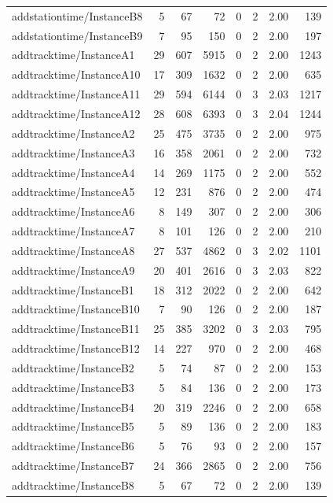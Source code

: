 \begin{tabular}{lrrrrrrr}
addstationtime/InstanceB8 & 5 & 67 & 72 & 0 & 2 & 2.00 & 139 \\
addstationtime/InstanceB9 & 7 & 95 & 150 & 0 & 2 & 2.00 & 197 \\
addtracktime/InstanceA1 & 29 & 607 & 5915 & 0 & 2 & 2.00 & 1243 \\
addtracktime/InstanceA10 & 17 & 309 & 1632 & 0 & 2 & 2.00 & 635 \\
addtracktime/InstanceA11 & 29 & 594 & 6144 & 0 & 3 & 2.03 & 1217 \\
addtracktime/InstanceA12 & 28 & 608 & 6393 & 0 & 3 & 2.04 & 1244 \\
addtracktime/InstanceA2 & 25 & 475 & 3735 & 0 & 2 & 2.00 & 975 \\
addtracktime/InstanceA3 & 16 & 358 & 2061 & 0 & 2 & 2.00 & 732 \\
addtracktime/InstanceA4 & 14 & 269 & 1175 & 0 & 2 & 2.00 & 552 \\
addtracktime/InstanceA5 & 12 & 231 & 876 & 0 & 2 & 2.00 & 474 \\
addtracktime/InstanceA6 & 8 & 149 & 307 & 0 & 2 & 2.00 & 306 \\
addtracktime/InstanceA7 & 8 & 101 & 126 & 0 & 2 & 2.00 & 210 \\
addtracktime/InstanceA8 & 27 & 537 & 4862 & 0 & 3 & 2.02 & 1101 \\
addtracktime/InstanceA9 & 20 & 401 & 2616 & 0 & 3 & 2.03 & 822 \\
addtracktime/InstanceB1 & 18 & 312 & 2022 & 0 & 2 & 2.00 & 642 \\
addtracktime/InstanceB10 & 7 & 90 & 126 & 0 & 2 & 2.00 & 187 \\
addtracktime/InstanceB11 & 25 & 385 & 3202 & 0 & 3 & 2.03 & 795 \\
addtracktime/InstanceB12 & 14 & 227 & 970 & 0 & 2 & 2.00 & 468 \\
addtracktime/InstanceB2 & 5 & 74 & 87 & 0 & 2 & 2.00 & 153 \\
addtracktime/InstanceB3 & 5 & 84 & 136 & 0 & 2 & 2.00 & 173 \\
addtracktime/InstanceB4 & 20 & 319 & 2246 & 0 & 2 & 2.00 & 658 \\
addtracktime/InstanceB5 & 5 & 89 & 136 & 0 & 2 & 2.00 & 183 \\
addtracktime/InstanceB6 & 5 & 76 & 93 & 0 & 2 & 2.00 & 157 \\
addtracktime/InstanceB7 & 24 & 366 & 2865 & 0 & 2 & 2.00 & 756 \\
addtracktime/InstanceB8 & 5 & 67 & 72 & 0 & 2 & 2.00 & 139 \\

\end{tabular}
